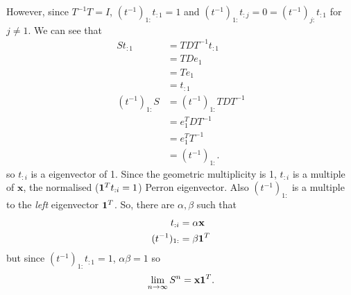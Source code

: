 \begin{solution}
  However, since $T^{-1}T = I$, $(t^{-1})_{1:}t_{:1} = 1$ and $(t^{-1})_{1:}t_{:j} = 0 = (t^{-1})_{j:}t_{:1}$ for $j \neq 1$.
  We can see that
  \begin{align*}
    St_{:1}
    & = TDT^{-1}t_{:1}\\
    & = TDe_1\\
    & = Te_1\\
    & = t_{:1}\\
    (t^{-1})_{1:}S
    & = (t^{-1})_{1:}TDT^{-1}\\
    & = e_1^TDT^{-1}\\
    & = e_1^TT^{-1}\\
    & = (t^{-1})_{1:}.
  \end{align*}
  so $t_{:i}$ is a eigenvector of 1.
  Since the geometric multiplicity is 1, $t_{:i}$ is a multiple of $\mathbf{x}$,
  the normalised ($\mathbf{1}^T t_{:i} = 1$) Perron eigenvector.
  Also $(t^{-1})_{1:}$ is a multiple to the \emph{left} eigenvector $\mathbf{1}^T$.
  So, there are $\alpha,\beta$ such that
  \begin{align*}
    t_{:i} & = \alpha \mathbf{x}\\
    (t^{-1})_{1:} & = \beta \mathbf{1}^T
  \end{align*}
  but since $(t^{-1})_{1:}t_{:1} = 1$, $\alpha\beta = 1$ so
  \[ \lim_{n \to \infty} S^n = \mathbf{x}\mathbf{1}^T. \]
\end{solution}
